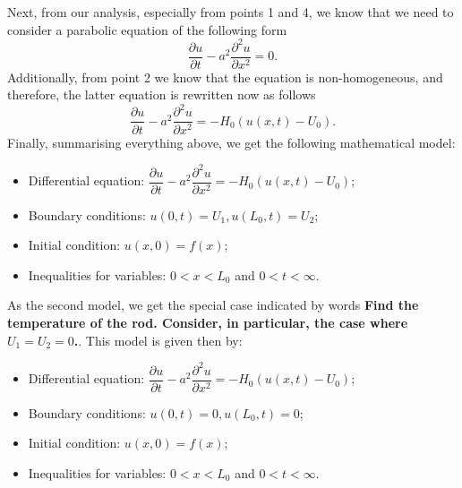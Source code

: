Next, from our analysis, especially from points 1 and 4, we know that we need to consider a parabolic equation of the following form
\begin{equation*}
\frac{\partial u}{\partial t} - a^{2}\frac{\partial^{2} u}{\partial x^{2}} = 0.
\end{equation*}
Additionally, from point 2 we know that the equation is non-homogeneous, and therefore, the latter equation is rewritten now as follows
\begin{equation*}
\frac{\partial u}{\partial t} - a^{2}\frac{\partial^{2} u}{\partial x^{2}} = -H_{0}(u(x,t)-U_{0}).
\end{equation*}
Finally, summarising everything above, we get the following mathematical model:
\begin{itemize}
\item Differential equation: $\dfrac{\partial u}{\partial t} - a^{2}\dfrac{\partial^{2} u}{\partial x^{2}} = -H_{0}(u(x,t)-U_{0})$;
\item Boundary conditions: $u(0,t) = U_{1}, u(L_{0},t) = U_{2}$;
\item Initial condition: $u(x,0)=f(x)$;
\item Inequalities for variables: $0<x<L_{0}$ and $0<t<\infty$.
\end{itemize}
As the second model, we get the special case indicated by words {\bfseries Find the temperature of the rod. Consider, in particular, the case where $U_{1}=U_{2}=0$.}. This model is given then by:
\begin{itemize}
\item Differential equation: $\dfrac{\partial u}{\partial t} - a^{2}\dfrac{\partial^{2} u}{\partial x^{2}} = -H_{0}(u(x,t)-U_{0})$;
\item Boundary conditions: $u(0,t) = 0, u(L_{0},t) = 0$;
\item Initial condition: $u(x,0)=f(x)$;
\item Inequalities for variables: $0<x<L_{0}$ and $0<t<\infty$.
\end{itemize}

